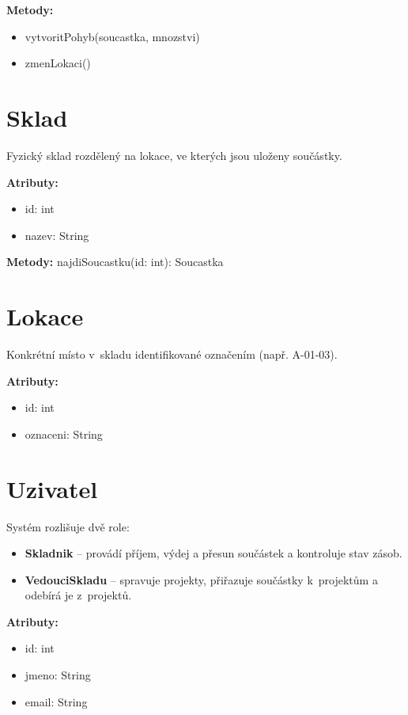\textbf{Metody:}\begin{itemize}[noitemsep,topsep=2pt]\item vytvoritPohyb(soucastka, mnozstvi)\item zmenLokaci()\end{itemize}

\section{Sklad}

Fyzický sklad rozdělený na lokace, ve kterých jsou uloženy součástky.

\textbf{Atributy:}\begin{itemize}[noitemsep,topsep=2pt]\item id: int\item nazev: String\end{itemize}

\textbf{Metody:} najdiSoucastku(id: int): Soucastka

\section{Lokace}

Konkrétní místo v~skladu identifikované označením (např. A-01-03).

\textbf{Atributy:}\begin{itemize}[noitemsep,topsep=2pt]\item id: int\item oznaceni: String\end{itemize}

\section{Uzivatel}

Systém rozlišuje dvě role:
\begin{itemize}[noitemsep,topsep=2pt]
  \item \textbf{Skladnik} -- provádí příjem, výdej a přesun součástek a kontroluje stav zásob.
  \item \textbf{VedouciSkladu} -- spravuje projekty, přiřazuje součástky k~projektům a odebírá je z~projektů.
\end{itemize}

\textbf{Atributy:}\begin{itemize}[noitemsep,topsep=2pt]\item id: int\item jmeno: String\item email: String\end{itemize}

